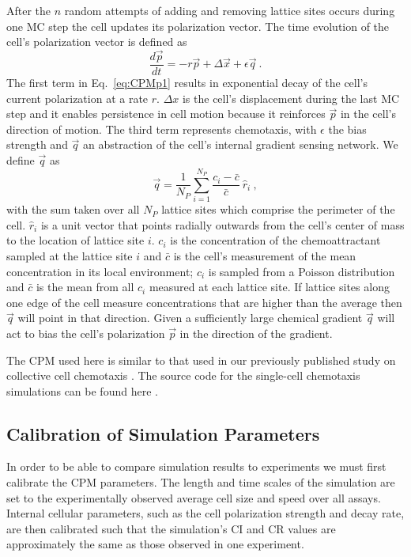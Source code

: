 After the $n$ random attempts of adding and removing lattice sites occurs during one MC step the cell updates its polarization vector. The time evolution of the cell's polarization vector is defined as
\begin{equation} \label{eq:CPMp1}
    \frac{d\vec{p}}{dt} = -r\vec{p} + \Delta\vec{x} + \epsilon \vec{q}\ .
\end{equation}
The first term in Eq.\ \ref{eq:CPMp1} results in exponential decay of the cell's current polarization at a rate $r$. $\Delta x$ is the cell's displacement during the last MC step and it enables persistence in cell motion because it reinforces $\vec{p}$ in the cell's direction of motion. The third term represents chemotaxis, with $\epsilon$ the bias strength and $\vec{q}$ an abstraction of the cell's internal gradient sensing network. We define $\vec{q}$ as
\begin{equation} \label{eq:CPMq1}
    \vec{q} = \frac{1}{N_P} \sum_{i=1}^{N_P} \frac{c_i-\bar{c}}{\bar{c}} \ \hat{r}_i \ ,
\end{equation}
with the sum taken over all $N_P$ lattice sites which comprise the perimeter of the cell. $\hat{r}_i$ is a unit vector that points radially outwards from the cell's center of mass to the location of lattice site $i$. $c_i$ is the concentration of the chemoattractant sampled at the lattice site $i$ and $\bar{c}$ is the cell's measurement of the mean concentration in its local environment; $c_i$ is sampled from a Poisson distribution and $\bar{c}$ is the mean from all $c_i$ measured at each lattice site. If lattice sites along one edge of the cell measure concentrations that are higher than the average then $\vec{q}$ will point in that direction. Given a sufficiently large chemical gradient $\vec{q}$ will act to bias the cell's polarization $\vec{p}$ in the direction of the gradient.

The CPM used here is similar to that used in our previously published study on collective cell chemotaxis \cite{varennes2016collective}. The source code for the single-cell chemotaxis simulations can be found here \cite{ch2code}.

\subsection{Calibration of Simulation Parameters}

In order to be able to compare simulation results to experiments we must first calibrate the CPM parameters. The length and time scales of the simulation are set to the experimentally observed average cell size and speed over all assays. Internal cellular parameters, such as the cell polarization strength and decay rate, are then calibrated such that the simulation's CI and CR values are approximately the same as those observed in one experiment.

